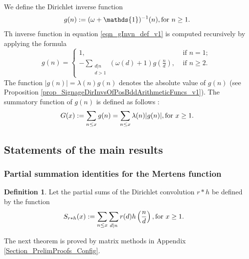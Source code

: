 \documentclass[11pt,reqno,a4letter]{article}
\newcommand{\hlocalref}[1]{\hyperref[#1]{\ref{#1}}}
\numberwithin{equation}{section}
\numberwithin{figure}{section}
\numberwithin{table}{section}
\newcommand{\seqnum}[1]{\href{http://oeis.org/#1}{\color{ProcessBlue}{\underline{#1}}}}
\theoremstyle{plain}
\numberwithin{theorem}{section}
\theoremstyle{definition}
\newtheorem{definition}[theorem]{Definition}
\theoremstyle{remark}
\newcommand{\mathtext}[1]{\text{\rm #1}}
\begin{document}
We define the Dirichlet inverse function \cite[\seqnum{A341444}]{OEIS} 
\begin{equation}
\label{eqn_gInvn_def_v1}
g(n) := (\omega + \mathds{1})^{-1}(n), \mathtext{ for } n \geq 1. 
\end{equation}
Th inverse function in equation \eqref{eqn_gInvn_def_v1} 
is computed recursively by applying the formula \cite[\S 2.7]{APOSTOLANUMT}
\[
g(n) = \begin{cases}
	1, & \text{ if $n = 1$; } \\ 
	-\sum\limits_{\substack{d|n \\ d> 1}} \left(\omega(d) + 1\right) g\left(\frac{n}{d}\right), & 
	\text{ if $n \geq 2$. }
        \end{cases}
\]
The function $|g(n)| = \lambda(n) g(n)$ denotes the absolute value of $g(n)$ 
(see Proposition \hlocalref{prop_SignageDirInvsOfPosBddArithmeticFuncs_v1}). 
The summatory function of $g(n)$ is defined as follows 
\cite[\seqnum{A341472}]{OEIS}: 
\begin{equation}
\label{eqn_GInvx_PartialSumForms_v1} 
G(x) := \sum_{n \leq x} g(n) = \sum_{n \leq x} \lambda(n) |g(n)|, \mathtext{ for } x \geq 1. 
\end{equation} 

\subsection{Statements of the main results}

\subsubsection{Partial summation identities for the Mertens function}

\begin{definition}
Let the partial sums of the 
Dirichlet convolution $r \ast h$ be defined by the function 
\begin{align*} 
S_{r \ast h}(x) & := \sum_{n \leq x} \sum_{d|n} r(d) h\left(\frac{n}{d}\right), 
	\mathtext{ for } x \geq 1. 
\end{align*}
\end{definition}

The next theorem is proved by matrix methods in 
Appendix \hlocalref{Section_PrelimProofs_Config}.
\end{document}
